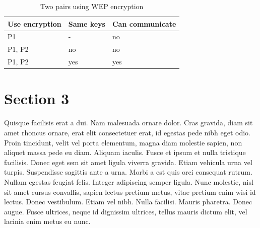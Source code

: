 \begin{table}[ht]
	\centering
	\begin{tabular}{ | l | l | l |} \hline
		\textbf{Use encryption} & \textbf{Same keys} & \textbf{Can communicate} \\ \hline
		P1 & - & no \\ \hline
		P1, P2 & no & no \\ \hline
		P1, P2 & yes & yes \\ \hline
	\end{tabular}
	\caption{Two pairs using WEP encryption}
	\label{tab:results}
\end{table}

\section{Section 3}
Quisque facilisis erat a dui. Nam malesuada ornare dolor. Cras gravida, diam sit amet rhoncus ornare, erat elit consectetuer erat, id egestas pede nibh eget odio. Proin tincidunt, velit vel porta elementum, magna diam molestie sapien, non aliquet massa pede eu diam. Aliquam iaculis. Fusce et ipsum et nulla tristique facilisis. Donec eget sem sit amet ligula viverra gravida. Etiam vehicula urna vel turpis. Suspendisse sagittis ante a urna. Morbi a est quis orci consequat rutrum. Nullam egestas feugiat felis. Integer adipiscing semper ligula. Nunc molestie, nisl sit amet cursus convallis, sapien lectus pretium metus, vitae pretium enim wisi id lectus. Donec vestibulum. Etiam vel nibh. Nulla facilisi. Mauris pharetra. Donec augue. Fusce ultrices, neque id dignissim ultrices, tellus mauris dictum elit, vel lacinia enim metus eu nunc.